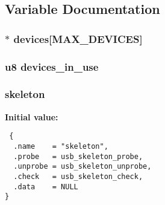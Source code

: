 \subsection{Variable Documentation}
\subsubsection{$\ast$ {\bf devices}[MAX\_\-DEVICES]}\label{skeleton_8c_20e31b9efc609f8b0aa5dbd4f2709708}


\subsubsection{\setlength{\rightskip}{0pt plus 5cm}u8 {\bf devices\_\-in\_\-use}}\label{skeleton_8c_d64afe69017d377365c18164cd5639ff}


\subsubsection{ {\bf skeleton}}\label{skeleton_8c_0d3e5c6db9f69478761aecbc55ab9643}


\textbf{Initial value:}

\begin{Code}\begin{verbatim} {
  .name    = "skeleton",
  .probe   = usb_skeleton_probe,
  .unprobe = usb_skeleton_unprobe,
  .check   = usb_skeleton_check,
  .data    = NULL
}
\end{verbatim}\end{Code}
